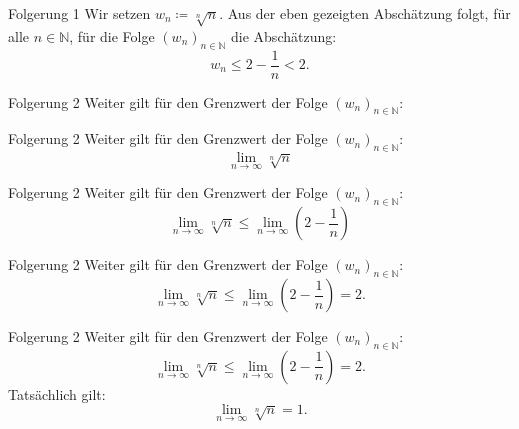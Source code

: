 \documentclass[10pt]{beamer}
\def\bN{\mathbb{N}}
\begin{document}
\begin{frame}{Folgerung 1}
    Wir setzen \( w_{n} \coloneq \sqrt[n]{n} \). Aus der eben gezeigten Abschätzung folgt, für alle \( n \in \bN \), für die Folge \( \left( w_{n} \right)_{n \in \bN} \) die Abschätzung:
    \[
        w_{n} 
        \leq 2 - \frac{1}{n}
        < 2.
    \]
\end{frame}

\begin{frame}{Folgerung 2}
    Weiter gilt für den Grenzwert der Folge \( \left( w_{n} \right)_{n \in \bN} \):
\end{frame}



\begin{frame}{Folgerung 2}
    Weiter gilt für den Grenzwert der Folge \( \left( w_{n} \right)_{n \in \bN} \):
    \[
        \lim_{n \to \infty} \sqrt[n]{n}
    \]
\end{frame}



\begin{frame}{Folgerung 2}
    Weiter gilt für den Grenzwert der Folge \( \left( w_{n} \right)_{n \in \bN} \):
    \[
        \lim_{n \to \infty} \sqrt[n]{n} 
        \leq \lim_{n \to \infty} \left( 2 - \frac{1}{n} \right)
    \]
\end{frame}



\begin{frame}{Folgerung 2}
    Weiter gilt für den Grenzwert der Folge \( \left( w_{n} \right)_{n \in \bN} \):
    \[
        \lim_{n \to \infty} \sqrt[n]{n} 
        \leq \lim_{n \to \infty} \left( 2 - \frac{1}{n} \right)
        = 2.
    \]
\end{frame}



\begin{frame}{Folgerung 2}
    Weiter gilt für den Grenzwert der Folge \( \left( w_{n} \right)_{n \in \bN} \):
    \[
        \lim_{n \to \infty} \sqrt[n]{n} 
        \leq \lim_{n \to \infty} \left( 2 - \frac{1}{n} \right)
        = 2.
    \]
    Tatsächlich gilt:
    \[
        \lim_{n \to \infty} \sqrt[n]{n} 
        = 1.
    \]
\end{frame}
\end{document}
